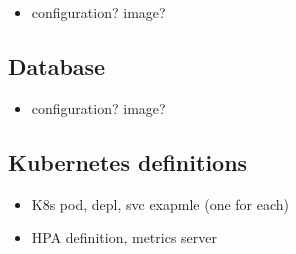 \begin{itemize}
	\item configuration? image?
\end{itemize}

\subsection{Database}

\begin{itemize}
	\item configuration? image?
\end{itemize}


\subsection{Kubernetes definitions}


\begin{itemize}
	\item K8s pod, depl, svc exapmle (one for each)
	\item HPA definition, metrics server
\end{itemize}
















